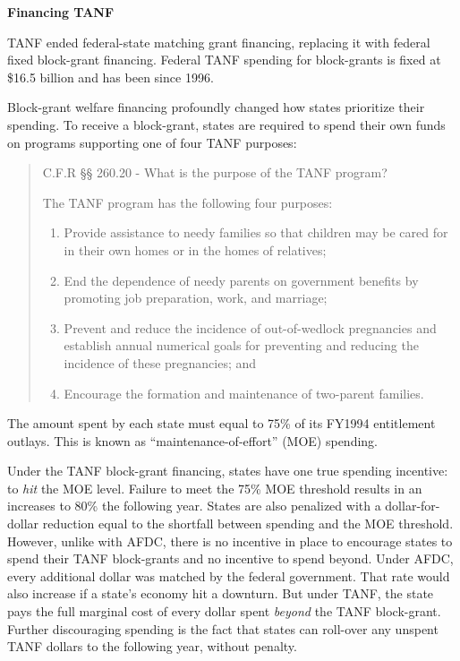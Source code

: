 \documentclass[12pt,letterpaperpaper,]{book}
\begin{document}
\textbf{Financing TANF}

TANF ended federal-state matching grant financing, replacing it with
federal fixed block-grant financing. Federal TANF spending for
block-grants is fixed at \$16.5 billion and has been since 1996.

Block-grant welfare financing profoundly changed how states prioritize
their spending. To receive a block-grant, states are required to spend
their own funds on programs supporting one of four TANF purposes:

\begin{quote}
C.F.R §§ 260.20 - What is the purpose of the TANF program?

The TANF program has the following four purposes:

\begin{enumerate}
\def\labelenumi{(\alph{enumi})}
\item
  Provide assistance to needy families so that children may be cared for
  in their own homes or in the homes of relatives;
\item
  End the dependence of needy parents on government benefits by
  promoting job preparation, work, and marriage;
\item
  Prevent and reduce the incidence of out-of-wedlock pregnancies and
  establish annual numerical goals for preventing and reducing the
  incidence of these pregnancies; and
\item
  Encourage the formation and maintenance of two-parent families.
\end{enumerate}
\end{quote}

The amount spent by each state must equal to 75\% of its FY1994
entitlement outlays. This is known as ``maintenance-of-effort'' (MOE)
spending.

Under the TANF block-grant financing, states have one true spending
incentive: to \emph{hit} the MOE level. Failure to meet the 75\% MOE
threshold results in an increases to 80\% the following year. States are
also penalized with a dollar-for-dollar reduction equal to the shortfall
between spending and the MOE threshold. However, unlike with AFDC, there
is no incentive in place to encourage states to spend their TANF
block-grants and no incentive to spend beyond. Under AFDC, every
additional dollar was matched by the federal government. That rate would
also increase if a state's economy hit a downturn. But under TANF, the
state pays the full marginal cost of every dollar spent \emph{beyond}
the TANF block-grant. Further discouraging spending is the fact that
states can roll-over any unspent TANF dollars to the following year,
without penalty.
\end{document}
